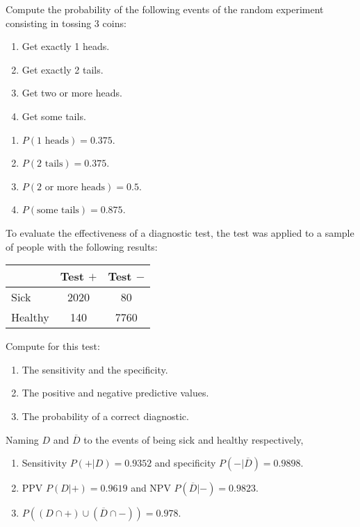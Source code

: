 {Compute the probability of the following events of the random experiment consisting in tossing 3 coins: 
\begin{enumerate}
\item Get exactly 1 heads. 
\item Get exactly 2 tails.
\item Get two or more heads.
\item Get some tails. 
\end{enumerate}
}
{
\begin{enumerate}
\item $P(\mbox{1 heads})=0.375$. 
\item $P(\mbox{2 tails})=0.375$. 
\item $P(\mbox{2 or more heads})=0.5$. 
\item $P(\mbox{some tails})=0.875$.
\end{enumerate}
}
{}


{To evaluate the effectiveness of a diagnostic test, the test was applied to a sample of people with the
following results:

\begin{center}
\begin{tabular}{|l|c|c|}
\cline{2-3}
\multicolumn{1}{l|}{} & Test $+$ & Test $-$ \\
\hline
Sick & 2020 & 80 \\
\hline
Healthy & 140 & 7760 \\
\hline
\end{tabular}
\end{center}

Compute for this test:
\begin{enumerate}
\item The sensitivity and the specificity.
\item The positive and negative predictive values.
\item The probability of a correct diagnostic. 
\end{enumerate}
}
{Naming $D$ and $\overline D$ to the events of being sick and healthy respectively,
\begin{enumerate}
\item Sensitivity $P(+|D)=0.9352$ and specificity $P(-|\overline D)=0.9898$. 
\item PPV $P(D|+)=0.9619$ and NPV $P(\overline D|-)=0.9823$.
\item $P((D\cap +)\cup (\overline D\cap -))= 0.978$.
\end{enumerate}
}
{}



